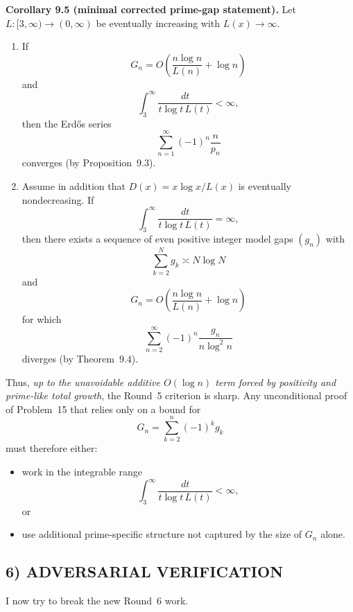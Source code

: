 \medskip

\textbf{Corollary 9.5 (minimal corrected prime-gap statement).}
Let \(L:[3,\infty)\to(0,\infty)\) be eventually increasing with \(L(x)\to\infty\).

\begin{enumerate}
\item[(a)] If
\[
G_n=O\!\left(\frac{n\log n}{L(n)}+\log n\right)
\]
and
\[
\int_3^\infty \frac{dt}{t\log t\,L(t)}<\infty,
\]
then the Erd\H{o}s series
\[
\sum_{n=1}^\infty (-1)^n \frac{n}{p_n}
\]
converges (by Proposition~9.3).

\item[(b)] Assume in addition that \(D(x)=x\log x/L(x)\) is eventually nondecreasing.
If
\[
\int_3^\infty \frac{dt}{t\log t\,L(t)}=\infty,
\]
then there exists a sequence of even positive integer model gaps \((g_n)\) with
\[
\sum_{k=2}^N g_k\asymp N\log N
\]
and
\[
G_n=O\!\left(\frac{n\log n}{L(n)}+\log n\right)
\]
for which
\[
\sum_{n=2}^\infty (-1)^n \frac{g_n}{n\log^2 n}
\]
diverges (by Theorem~9.4).
\end{enumerate}

Thus, \emph{up to the unavoidable additive \(O(\log n)\) term forced by positivity and prime-like total growth}, the Round~5 criterion is sharp.
Any unconditional proof of Problem~15 that relies only on a bound for
\[
G_n=\sum_{k=2}^n (-1)^k g_k
\]
must therefore either:
\begin{itemize}
\item work in the integrable range
\[
\int_3^\infty \frac{dt}{t\log t\,L(t)}<\infty,
\]
or
\item use additional prime-specific structure not captured by the size of \(G_n\) alone.
\end{itemize}

\subsection*{6) ADVERSARIAL VERIFICATION}

I now try to break the new Round~6 work.

